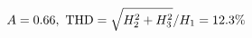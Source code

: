 \documentclass[preview]{standalone}
\begin{document}
\begin{align*}
\special{dvisvgm:raw <g id='unique000'>}A=0.66,\ \text{THD}=\sqrt{H_2^2+H_3^2}/H_1=12.3\%\special{dvisvgm:raw </g>}
\end{align*}
\end{document}
